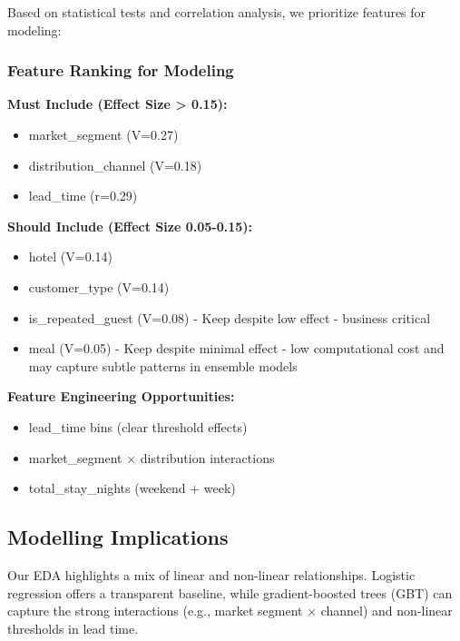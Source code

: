 \documentclass[
  letterpaper,
  DIV=11,
  numbers=noendperiod]{scrartcl}
\providecommand{\tightlist}{%
  \setlength{\itemsep}{0pt}\setlength{\parskip}{0pt}}
\begin{document}
Based on statistical tests and correlation analysis, we prioritize
features for modeling:

\subsubsection{Feature Ranking for
Modeling}\label{feature-ranking-for-modeling}

\textbf{Must Include (Effect Size \textgreater{} 0.15):}

\begin{itemize}
\tightlist
\item
  market\_segment (V=0.27)
\item
  distribution\_channel (V=0.18)
\item
  lead\_time (r=0.29)
\end{itemize}

\textbf{Should Include (Effect Size 0.05-0.15):}

\begin{itemize}
\tightlist
\item
  hotel (V=0.14)
\item
  customer\_type (V=0.14)
\item
  is\_repeated\_guest (V=0.08) - Keep despite low effect - business
  critical
\item
  meal (V=0.05) - Keep despite minimal effect - low computational cost
  and may capture subtle patterns in ensemble models
\end{itemize}

\textbf{Feature Engineering Opportunities:}

\begin{itemize}
\tightlist
\item
  lead\_time bins (clear threshold effects)
\item
  market\_segment × distribution interactions
\item
  total\_stay\_nights (weekend + week)
\end{itemize}

\subsection{Modelling Implications}\label{modelling-implications}

Our EDA highlights a mix of linear and non-linear relationships.
Logistic regression offers a transparent baseline, while
gradient-boosted trees (GBT) can capture the strong interactions (e.g.,
market segment × channel) and non-linear thresholds in lead time.
\end{document}
